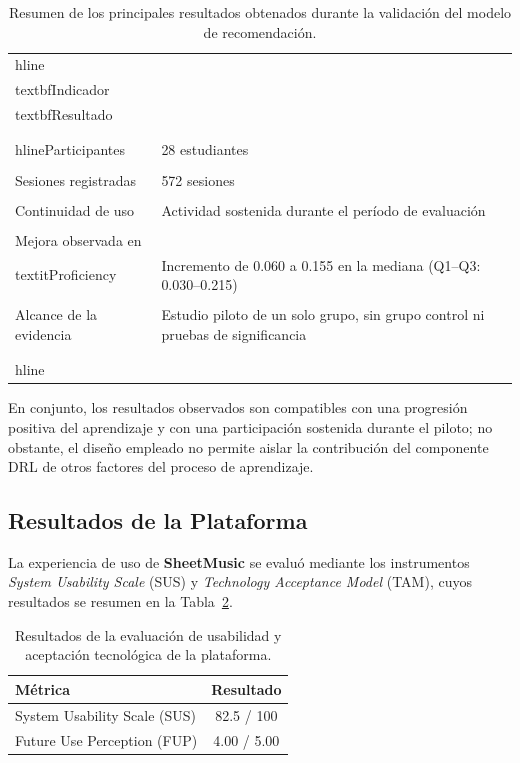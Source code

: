 \begin{table}[htbp]
\centering
\caption{Resumen de los principales resultados obtenados durante la validación del modelo de recomendación.}
\label{tab:resultados_ieee}
\begin{tabular}{lp{5.2cm}}\\hline\\textbf{Indicador} & \\textbf{Resultado} \\\\\\hlineParticipantes & 28 estudiantes \\\\Sesiones registradas & 572 sesiones \\\\Continuidad de uso & Actividad sostenida durante el período de evaluación \\\\Mejora observada en \\textit{Proficiency} & Incremento de 0.060 a 0.155 en la mediana (Q1--Q3: 0.030--0.215) \\\\Alcance de la evidencia & Estudio piloto de un solo grupo, sin grupo control ni pruebas de significancia \\\\\\hline\\
\end{tabular}
\end{table}

En conjunto, los resultados observados son compatibles con una progresión positiva del aprendizaje y con una participación sostenida durante el piloto; no obstante, el diseño empleado no permite aislar la contribución del componente DRL de otros factores del proceso de aprendizaje.

\subsection{Resultados de la Plataforma}

La experiencia de uso de \textbf{SheetMusic} se evaluó mediante los instrumentos \textit{System Usability Scale} (SUS) y \textit{Technology Acceptance Model} (TAM), cuyos resultados se resumen en la Tabla~\ref{tab:sus_tam}.

\begin{table}[htbp]
\centering
\caption{Resultados de la evaluación de usabilidad y aceptación tecnológica de la plataforma.}
\label{tab:sus_tam}
\begin{tabular}{lc}
\hline
\textbf{Métrica} & \textbf{Resultado} \\
\hline
System Usability Scale (SUS) & 82.5 / 100 \\
Future Use Perception (FUP) & 4.00 / 5.00 \\
\hline
\end{tabular}
\end{table}

